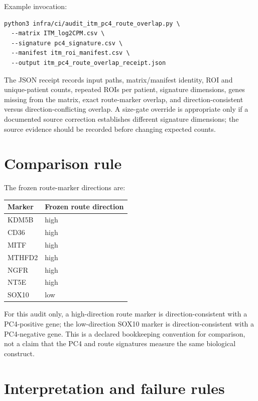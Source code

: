 \documentclass[11pt]{article}
\begin{document}
Example invocation:

\begin{verbatim}
python3 infra/ci/audit_itm_pc4_route_overlap.py \
  --matrix ITM_log2CPM.csv \
  --signature pc4_signature.csv \
  --manifest itm_roi_manifest.csv \
  --output itm_pc4_route_overlap_receipt.json
\end{verbatim}

The JSON receipt records input paths, matrix/manifest identity, ROI and unique-patient counts, repeated ROIs per patient, signature dimensions, genes missing from the matrix, exact route-marker overlap, and direction-consistent versus direction-conflicting overlap. A size-gate override is appropriate only if a documented source correction establishes different signature dimensions; the source evidence should be recorded before changing expected counts.

\section{Comparison rule}

The frozen route-marker directions are:
\begin{center}
\begin{tabular}{ll}
\toprule
\textbf{Marker} & \textbf{Frozen route direction}\\
\midrule
KDM5B & high\\
CD36 & high\\
MITF & high\\
MTHFD2 & high\\
NGFR & high\\
NT5E & high\\
SOX10 & low\\
\bottomrule
\end{tabular}
\end{center}

For this audit only, a high-direction route marker is direction-consistent with a PC4-positive gene; the low-direction SOX10 marker is direction-consistent with a PC4-negative gene. This is a declared bookkeeping convention for comparison, not a claim that the PC4 and route signatures measure the same biological construct.

\section{Interpretation and failure rules}
\end{document}
